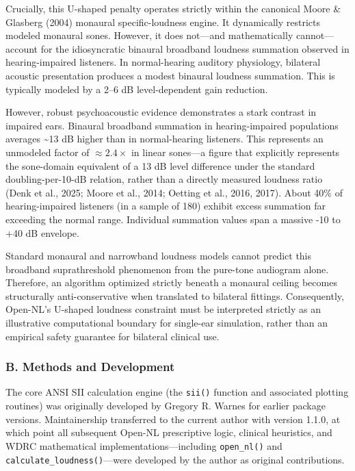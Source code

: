 \documentclass[
  12pt,
]{article}
\begin{document}
Crucially, this U-shaped penalty operates strictly within the canonical
Moore \& Glasberg (2004) monaural specific-loudness engine. It
dynamically restricts modeled monaural sones. However, it does not---and
mathematically cannot---account for the idiosyncratic binaural broadband
loudness summation observed in hearing-impaired listeners. In
normal-hearing auditory physiology, bilateral acoustic presentation
produces a modest binaural loudness summation. This is typically modeled
by a 2--6 dB level-dependent gain reduction.

However, robust psychoacoustic evidence demonstrates a stark contrast in
impaired ears. Binaural broadband summation in hearing-impaired
populations averages \textasciitilde13 dB higher than in normal-hearing
listeners. This represents an unmodeled factor of \(\approx 2.4\times\)
in linear sones---a figure that explicitly represents the sone-domain
equivalent of a 13 dB level difference under the standard
doubling-per-10-dB relation, rather than a directly measured loudness
ratio (Denk et al., 2025; Moore et al., 2014; Oetting et al., 2016,
2017). About 40\% of hearing-impaired listeners (in a sample of 180)
exhibit excess summation far exceeding the normal range. Individual
summation values span a massive -10 to +40 dB envelope.

Standard monaural and narrowband loudness models cannot predict this
broadband suprathreshold phenomenon from the pure-tone audiogram alone.
Therefore, an algorithm optimized strictly beneath a monaural ceiling
becomes structurally anti-conservative when translated to bilateral
fittings. Consequently, Open-NL's U-shaped loudness constraint must be
interpreted strictly as an illustrative computational boundary for
single-ear simulation, rather than an empirical safety guarantee for
bilateral clinical use.

\subsubsection{B. Methods and
Development}\label{b.-methods-and-development}

The core ANSI SII calculation engine (the \texttt{sii()} function and
associated plotting routines) was originally developed by Gregory R.
Warnes for earlier package versions. Maintainership transferred to the
current author with version 1.1.0, at which point all subsequent Open-NL
prescriptive logic, clinical heuristics, and WDRC mathematical
implementations---including \texttt{open\_nl()} and
\texttt{calculate\_loudness()}---were developed by the author as
original contributions.
\end{document}
